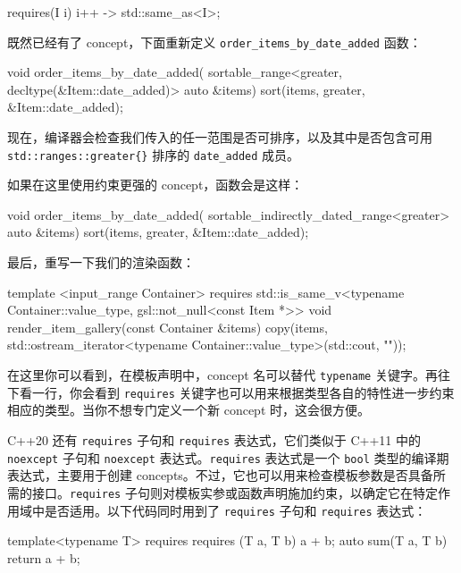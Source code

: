 \begin{codebox}[cpp]
requires(I i) {
    { i++ } -> std::same_as<I>;
}
\end{codebox}

既然已经有了 concept，下面重新定义 \texttt{order\_\allowbreak{}items\_\allowbreak{}by\_\allowbreak{}date\_\allowbreak{}added} 函数：

\begin{codebox}[text]
void order_items_by_date_added(
    sortable_range<greater, decltype(&Item::date_added)> auto &items) {
    sort(items, greater{}, &Item::date_added);
}
\end{codebox}

现在，编译器会检查我们传入的任一范围是否可排序，以及其中是否包含可用 \texttt{std::\allowbreak{}ranges::\allowbreak{}greater\{\allowbreak{}\}\allowbreak{}} 排序的 \texttt{date\_\allowbreak{}added} 成员。

如果在这里使用约束更强的 concept，函数会是这样：

\begin{codebox}[text]
void order_items_by_date_added(
    sortable_indirectly_dated_range<greater> auto &items) {
    sort(items, greater{}, &Item::date_added);
}
\end{codebox}

最后，重写一下我们的渲染函数：

\begin{codebox}[cpp]
template <input_range Container>
requires std::is_same_v<typename Container::value_type, gsl::not_null<const Item *>>
void render_item_gallery(const Container &items) {
    copy(items, std::ostream_iterator<typename Container::value_type>(std::cout, "\n"));
}
\end{codebox}

在这里你可以看到，在模板声明中，concept 名可以替代 \texttt{typename} 关键字。再往下看一行，你会看到 \texttt{requires} 关键字也可以用来根据类型各自的特性进一步约束相应的类型。当你不想专门定义一个新 concept 时，这会很方便。

\label{idx:510}
C++20 还有 \texttt{requires} 子句和 \texttt{requires} 表达式，它们类似于 C++11 中的 \texttt{noexcept} 子句和 \texttt{noexcept} 表达式。\texttt{requires} 表达式是一个 \texttt{bool} 类型的编译期表达式，主要用于创建 concepts。不过，它也可以用来检查模板参数是否具备所需的接口。\texttt{requires} 子句则对模板实参或函数声明施加约束，以确定它在特定作用域中是否适用。以下代码同时用到了 \texttt{requires} 子句和 \texttt{requires} 表达式：

\begin{codebox}[cpp]
template<typename T>
requires requires (T a, T b) { a + b; }
auto sum(T a, T b) { return a + b; }
\end{codebox}


